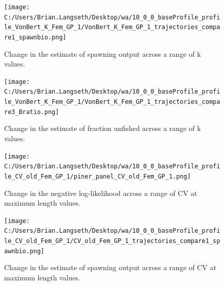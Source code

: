\documentclass[11pt,
  english,
  a4paper,
]{article}
\begin{document}
\tagmcend\tagstructend


\begin{figure}
\centering
\texttt{[image: C:/Users/Brian.Langseth/Desktop/wa/10\_0\_0\_baseProfile\_profile\_VonBert\_K\_Fem\_GP\_1/VonBert\_K\_Fem\_GP\_1\_trajectories\_compare1\_spawnbio.png]}
\caption{Change in the estimate of spawning output across a range of k values.\label{fig:k-ssb}}
\end{figure}

\tagmcend\tagstructend


\begin{figure}
\centering
\texttt{[image: C:/Users/Brian.Langseth/Desktop/wa/10\_0\_0\_baseProfile\_profile\_VonBert\_K\_Fem\_GP\_1/VonBert\_K\_Fem\_GP\_1\_trajectories\_compare3\_Bratio.png]}
\caption{Change in the estimate of fraction unfished across a range of k values.\label{fig:k-depl}}
\end{figure}

\tagmcend\tagstructend


\begin{figure}
\centering
\texttt{[image: C:/Users/Brian.Langseth/Desktop/wa/10\_0\_0\_baseProfile\_profile\_CV\_old\_Fem\_GP\_1/piner\_panel\_CV\_old\_Fem\_GP\_1.png]}
\caption{Change in the negative log-likelihood across a range of CV at maximum length values.\label{fig:cv2-profile}}
\end{figure}

\tagmcend\tagstructend


\begin{figure}
\centering
\texttt{[image: C:/Users/Brian.Langseth/Desktop/wa/10\_0\_0\_baseProfile\_profile\_CV\_old\_Fem\_GP\_1/CV\_old\_Fem\_GP\_1\_trajectories\_compare1\_spawnbio.png]}
\caption{Change in the estimate of spawning output across a range of CV at maximum length values.\label{fig:cv2-ssb}}
\end{figure}
\end{document}
